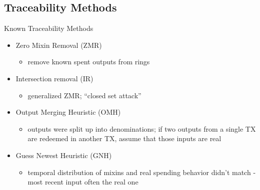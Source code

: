 \subsection{Traceability Methods}
\begin{frame}{Known Traceability Methods}
	\begin{itemize}[<+-|alert@+>]
		\item Zero Mixin Removal (ZMR)
		\begin{itemize}
			\item remove known spent outputs from rings
		\end{itemize}
		\item Intersection removal (IR)
		\begin{itemize}
			\item generalized ZMR; ``closed set attack''
		\end{itemize}
		\item Output Merging Heuristic (OMH)
		\begin{itemize}
			\item outputs were split up into denominations; if two outputs from a single TX are redeemed in another TX, assume that those inputs are real
		\end{itemize}
		\item Guess Newest Heuristic (GNH)
		\begin{itemize}
			\item temporal distribution of mixins and real spending behavior didn't match - most recent input often the real one
		\end{itemize}
	\end{itemize}
\end{frame}

